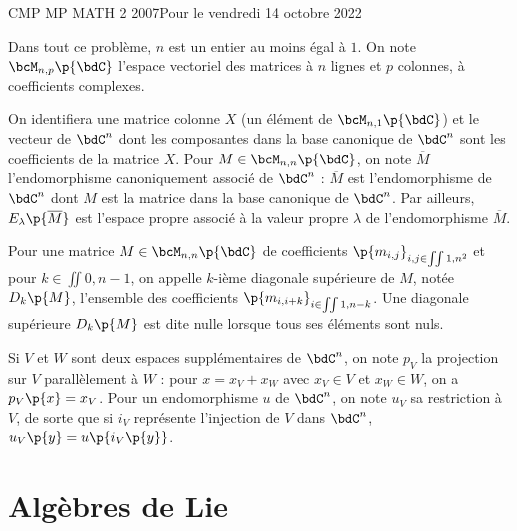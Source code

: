 \documentclass[a4paper,french,bookmarks]{article}
\begin{document}
    \renewcommand{\thesection}{\Roman{section}}
    \renewcommand{\thesection}{\Roman{section}}
    \renewcommand{\labelenumi}{\Roman{section}.\arabic{enumi}.}
    \renewcommand*{\labelenumii}{\alph{enumii}.}

    {CMP MP MATH 2 2007}{Pour le vendredi 14 octobre 2022}
    
    \begin{enumerate}
        \itt Dans tout ce problème, $n$ est un entier au moins égal à $1$. On note $\bcM_{n, p}\p{\bdC}$ l'espace vectoriel des matrices à $n$ lignes et $p$ colonnes, à coefficients complexes.
    
        \itt On identifiera une matrice colonne $X$ (un élément de $\bcM_{n, 1}\p{\bdC}$) et le vecteur de $\bdC^n$ dont les composantes dans la base canonique de $\bdC^n$ sont les coefficients de la matrice $X$. Pour $M \in \bcM_{n, n}\p{\bdC}$, on note $\overline M$ l'endomorphisme canoniquement associé de $\bdC^n$ : $\overline M$ est l'endomorphisme de $\bdC^n$ dont $M$ est la matrice dans la base canonique de $\bdC^n$. Par ailleurs, $E_\lambda\p{\overline M}$ est l'espace propre associé à la valeur propre $\lambda$ de l'endomorphisme $\overline M$.
    
        \itt Pour une matrice $M \in \bcM_{n, n}\p{\bdC}$ de coefficients $\p{m_{i, j}}_{i, j \in \iint{1, n}^2}$ et pour $k \in \iint{0, n-1}$, on appelle $k$-ième diagonale supérieure de $M$, notée $D_k\p{M}$, l'ensemble des coefficients $\p{m_{i, i+k}}_{i \in \iint{1, n-k}}$. Une diagonale supérieure $D_k\p{M}$ est dite nulle lorsque tous ses éléments sont nuls.
    
        \itt Si $V$ et $W$ sont deux espaces supplémentaires de $\bdC^n$, on note $p_V$ la projection sur $V$ parallèlement à $W$ : pour $x = x_V +x_W$ avec $x_V \in V$ et $x_W \in W$, on a $p_V\p{x} = x_V$. Pour un endomorphisme $u$ de $\bdC^n$, on note $u_V$ sa restriction à $V$, de sorte que si $i_V$ représente l'injection de $V$ dans $\bdC^n$, $u_V\p{y} = u\p{i_V\p{y}}$.

    \end{enumerate}
    
    \section{Algèbres de Lie}
    
\end{document}
